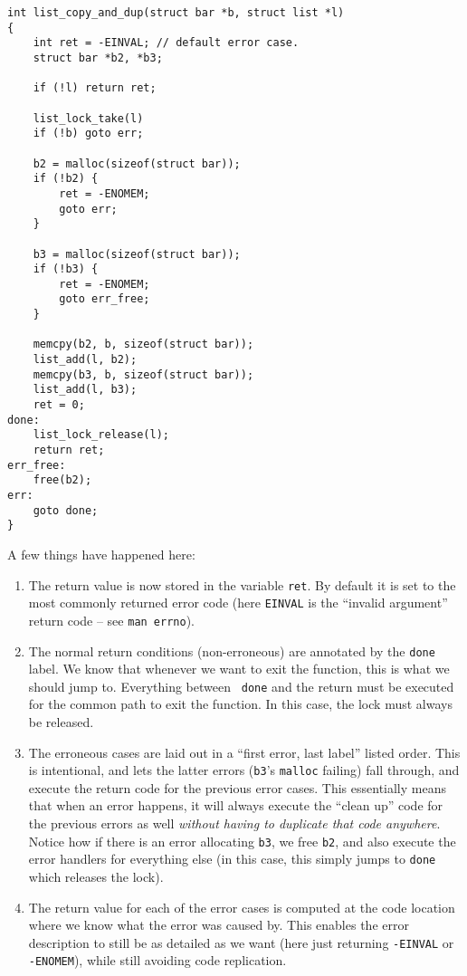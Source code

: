 \documentclass[11pt,onecolumn]{article}
\begin{document}
    \begin{minipage}{3in}
      \footnotesize
      \lstset{language=C}
      \begin{lstlisting}
int list_copy_and_dup(struct bar *b, struct list *l) 
{
    int ret = -EINVAL; // default error case.
    struct bar *b2, *b3;

    if (!l) return ret;

    list_lock_take(l)
    if (!b) goto err;

    b2 = malloc(sizeof(struct bar));
    if (!b2) {
        ret = -ENOMEM;
        goto err;
    }

    b3 = malloc(sizeof(struct bar));
    if (!b3) {
        ret = -ENOMEM;
        goto err_free;
    }

    memcpy(b2, b, sizeof(struct bar));
    list_add(l, b2);
    memcpy(b3, b, sizeof(struct bar));
    list_add(l, b3);
    ret = 0;
done:
    list_lock_release(l);
    return ret;
err_free:
    free(b2);
err:
    goto done;
}        
      \end{lstlisting}
    \end{minipage}

A few things have happened here:
\begin{enumerate}[itemsep=0pt,topsep=1pt,parsep=1pt,leftmargin=2.5em]
\item The return value is now stored in the variable {\tt ret}.  By
  default it is set to the most commonly returned error code (here
  {\tt EINVAL} is the ``invalid argument'' return code -- see {\tt man
    errno}).
\item The normal return conditions (non-erroneous) are annotated by
  the {\tt done} label.  We know that whenever we want to exit the
  function, this is what we should jump to.  Everything between {\tt
    done} and the return must be executed for the common path to exit
  the function.  In this case, the lock must always be released.
\item The erroneous cases are laid out in a ``first error, last
  label'' listed order.  This is intentional, and lets the latter
  errors ({\tt b3}'s {\tt malloc} failing) fall through, and execute
  the return code for the previous error cases.  This essentially
  means that when an error happens, it will always execute the ``clean
  up'' code for the previous errors as well {\em without having to
    duplicate that code anywhere}.  Notice how if there is an error
  allocating {\tt b3}, we free {\tt b2}, and also execute the error
  handlers for everything else (in this case, this simply jumps to
  {\tt done} which releases the lock).  
\item The return value for each of the error cases is computed at the
  code location where we know what the error was caused by.  This
  enables the error description to still be as detailed as we want
  (here just returning {\tt -EINVAL} or {\tt -ENOMEM}), while still
  avoiding code replication.
\end{enumerate}
\end{document}
